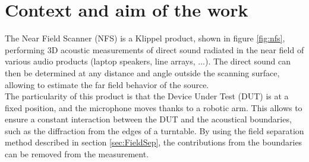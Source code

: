 \documentclass{report}
\begin{document}
    
\section{Context and aim of the work}

\begin{minipage}{0.6\textwidth}
The Near Field Scanner (NFS) is a Klippel product, shown in figure \ref{fig:nfs}, performing 3D acoustic measurements of direct sound radiated in the near field of various audio products (laptop speakers, line arrays, ...). The direct sound can then be determined at any distance and angle outside the scanning surface, allowing to estimate the far field behavior of the source. \\

The particularity of this product is that the Device Under Test (DUT) is at a fixed position, and the microphone moves thanks to a robotic arm. This allows to ensure a constant interaction between the DUT and the acoustical boundaries, such as the diffraction from the edges of a turntable. By using the field separation method described in section \ref{sec:FieldSep}, the contributions from the boundaries can be removed from the measurement. 
\end{minipage}
\end{document}
